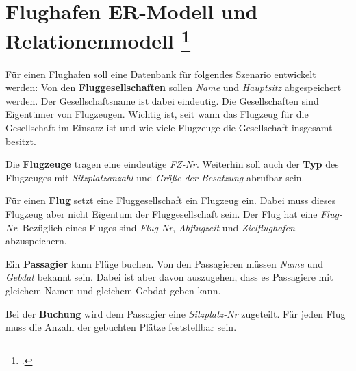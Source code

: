 \documentclass{lehramt-informatik-aufgabe}
\begin{document}

\section{Flughafen ER-Modell und Relationenmodell
\footcite[Aufgabe 1: Wiederholung ER-Modell und Relationenmodell]{db:ab:klausurvorbereitung}}

Für einen Flughafen soll eine Datenbank für folgendes Szenario
entwickelt werden: Von den \textbf{Fluggesellschaften} sollen
\emph{Name} und \emph{Hauptsitz} abgespeichert werden. Der
Gesellschaftsname ist dabei eindeutig. Die Gesellschaften sind
Eigentümer von Flugzeugen. Wichtig ist, seit wann das Flugzeug für die
Gesellschaft im Einsatz ist und wie viele Flugzeuge die Gesellschaft
insgesamt besitzt.

Die \textbf{Flugzeuge} tragen eine eindeutige \emph{FZ-Nr}.
Weiterhin soll auch der \textbf{Typ} des Flugzeuges mit
\emph{Sitzplatzanzahl} und \emph{Größe der Besatzung} abrufbar sein.

Für einen \textbf{Flug} setzt eine Fluggesellschaft ein Flugzeug ein.
Dabei muss dieses Flugzeug aber nicht Eigentum der Fluggesellschaft
sein. Der Flug hat eine \emph{Flug-Nr}. Bezüglich eines Fluges sind
\emph{Flug-Nr}, \emph{Abflugzeit} und \emph{Zielflughafen} abzuspeichern.

Ein \textbf{Passagier} kann Flüge buchen. Von den Passagieren müssen
\emph{Name} und \emph{Gebdat} bekannt sein. Dabei ist aber davon
auszugehen, dass es Passagiere mit gleichem Namen und gleichem
Gebdat geben kann.

Bei der \textbf{Buchung} wird dem Passagier eine \emph{Sitzplatz-Nr}
zugeteilt. Für jeden Flug muss die Anzahl der gebuchten Plätze
feststellbar sein.
\end{document}

